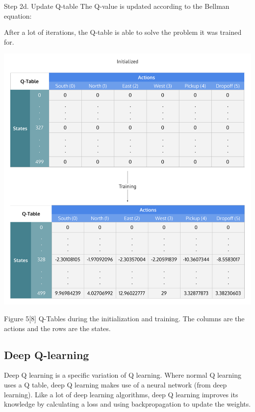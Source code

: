 \documentclass{article}
\begin{document}
\begin{flushleft}
Step 2d. Update Q-table 
The Q-value is updated according to the Bellman equation:
\newline
\end{flushleft}

\begin{flushleft}
After a lot of iterations, the Q-table is able to solve the problem it was trained for.
\end{flushleft}

\begin{center}
\includegraphics[width=\linewidth]{q_table}
\end{center}

Figure 5[8] Q-Tables during the initialization and training. The columns are the actions and the rows are the states. 

\subsection{Deep Q-learning}
Deep Q learning is a specific variation of Q learning. Where normal Q learning uses a Q table, deep Q learning makes use of a neural network (from deep learning). Like a lot of deep learning algorithms, deep Q learning improves its knowledge by calculating a loss and using backpropagation to update the weights. 
\end{document}

